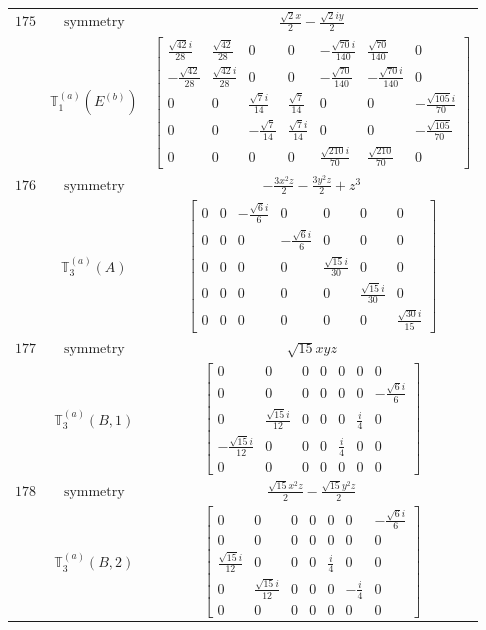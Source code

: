 \documentclass[fleqn,8pt,landscape]{jsarticle}
\begin{document}
\begin{longtable}{ccc}
$ 175 $ & $ \text{symmetry} $ & $ \frac{\sqrt{2} x}{2} - \frac{\sqrt{2} i y}{2} $ \\
$  $ & $ \mathbb{T}_{1}^{(a)}(E^{(b)}) $ & $ \begin{bmatrix} \frac{\sqrt{42} i}{28} & \frac{\sqrt{42}}{28} & 0 & 0 & - \frac{\sqrt{70} i}{140} & \frac{\sqrt{70}}{140} & 0 \\ - \frac{\sqrt{42}}{28} & \frac{\sqrt{42} i}{28} & 0 & 0 & - \frac{\sqrt{70}}{140} & - \frac{\sqrt{70} i}{140} & 0 \\ 0 & 0 & \frac{\sqrt{7} i}{14} & \frac{\sqrt{7}}{14} & 0 & 0 & - \frac{\sqrt{105} i}{70} \\ 0 & 0 & - \frac{\sqrt{7}}{14} & \frac{\sqrt{7} i}{14} & 0 & 0 & - \frac{\sqrt{105}}{70} \\ 0 & 0 & 0 & 0 & \frac{\sqrt{210} i}{70} & \frac{\sqrt{210}}{70} & 0 \end{bmatrix} $ \\ \hline
$ 176 $ & $ \text{symmetry} $ & $ - \frac{3 x^{2} z}{2} - \frac{3 y^{2} z}{2} + z^{3} $ \\
$  $ & $ \mathbb{T}_{3}^{(a)}(A) $ & $ \begin{bmatrix} 0 & 0 & - \frac{\sqrt{6} i}{6} & 0 & 0 & 0 & 0 \\ 0 & 0 & 0 & - \frac{\sqrt{6} i}{6} & 0 & 0 & 0 \\ 0 & 0 & 0 & 0 & \frac{\sqrt{15} i}{30} & 0 & 0 \\ 0 & 0 & 0 & 0 & 0 & \frac{\sqrt{15} i}{30} & 0 \\ 0 & 0 & 0 & 0 & 0 & 0 & \frac{\sqrt{30} i}{15} \end{bmatrix} $ \\ \hline
$ 177 $ & $ \text{symmetry} $ & $ \sqrt{15} x y z $ \\
$  $ & $ \mathbb{T}_{3}^{(a)}(B,1) $ & $ \begin{bmatrix} 0 & 0 & 0 & 0 & 0 & 0 & 0 \\ 0 & 0 & 0 & 0 & 0 & 0 & - \frac{\sqrt{6} i}{6} \\ 0 & \frac{\sqrt{15} i}{12} & 0 & 0 & 0 & \frac{i}{4} & 0 \\ - \frac{\sqrt{15} i}{12} & 0 & 0 & 0 & \frac{i}{4} & 0 & 0 \\ 0 & 0 & 0 & 0 & 0 & 0 & 0 \end{bmatrix} $ \\ \hline
$ 178 $ & $ \text{symmetry} $ & $ \frac{\sqrt{15} x^{2} z}{2} - \frac{\sqrt{15} y^{2} z}{2} $ \\
$  $ & $ \mathbb{T}_{3}^{(a)}(B,2) $ & $ \begin{bmatrix} 0 & 0 & 0 & 0 & 0 & 0 & - \frac{\sqrt{6} i}{6} \\ 0 & 0 & 0 & 0 & 0 & 0 & 0 \\ \frac{\sqrt{15} i}{12} & 0 & 0 & 0 & \frac{i}{4} & 0 & 0 \\ 0 & \frac{\sqrt{15} i}{12} & 0 & 0 & 0 & - \frac{i}{4} & 0 \\ 0 & 0 & 0 & 0 & 0 & 0 & 0 \end{bmatrix} $ \\ \hline

\end{longtable}
\end{document}
